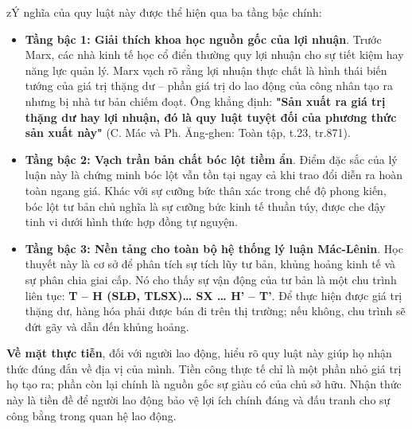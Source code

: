 zÝ nghĩa của quy luật này được thể hiện qua ba tầng bậc chính:
\begin{itemize}
    \item \textbf{Tầng bậc 1: Giải thích khoa học nguồn gốc của lợi nhuận}. Trước Marx, các nhà kinh tế học cổ điển thường quy lợi nhuận cho sự tiết kiệm hay năng lực quản lý. Marx vạch rõ rằng lợi nhuận thực chất là hình thái biến tướng của giá trị thặng dư – phần giá trị do lao động của công nhân tạo ra nhưng bị nhà tư bản chiếm đoạt. Ông khẳng định: \textbf{"Sản xuất ra giá trị thặng dư hay lợi nhuận, đó là quy luật tuyệt đối của phương thức sản xuất này"} (C. Mác và Ph. Ăng-ghen: Toàn tập, t.23, tr.871).
    \item \textbf{Tầng bậc 2: Vạch trần bản chất bóc lột tiềm ẩn}. Điểm đặc sắc của lý luận này là chứng minh bóc lột vẫn tồn tại ngay cả khi trao đổi diễn ra hoàn toàn ngang giá. Khác với sự cưỡng bức thân xác trong chế độ phong kiến, bóc lột tư bản chủ nghĩa là sự cưỡng bức kinh tế thuần túy, được che đậy tinh vi dưới hình thức hợp đồng tự nguyện.
    \item \textbf{Tầng bậc 3: Nền tảng cho toàn bộ hệ thống lý luận Mác-Lênin}. Học thuyết này là cơ sở để phân tích sự tích lũy tư bản, khủng hoảng kinh tế và sự phân chia giai cấp. Nó cho thấy sự vận động của tư bản là một chu trình liên tục: \textbf{T – H (SLĐ, TLSX)… SX … H’ – T’}. Để thực hiện được giá trị thặng dư, hàng hóa phải được bán đi trên thị trường; nếu không, chu trình sẽ đứt gãy và dẫn đến khủng hoảng.
\end{itemize}
\textbf{Về mặt thực tiễn}, đối với người lao động, hiểu rõ quy luật này giúp họ nhận thức đúng đắn về địa vị của mình. Tiền công thực tế chỉ là một phần nhỏ giá trị họ tạo ra; phần còn lại chính là nguồn gốc sự giàu có của chủ sở hữu. Nhận thức này là tiền đề để người lao động bảo vệ lợi ích chính đáng và đấu tranh cho sự công bằng trong quan hệ lao động.